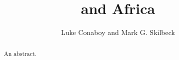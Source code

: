\documentclass[12pt, twocolumn, x11names]{article}
\title{\elnino{} and Africa}
\author{Luke Conaboy and Mark G. Skilbeck}
\date{}
\begin{document}
\maketitle

\begin{abstract}
  An abstract.
\end{abstract}







\cite{*}
\onecolumn{

}
\end{document}

